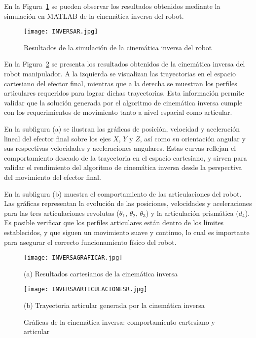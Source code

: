 En la Figura~\ref{fig:cinematica_inversa} se pueden observar los resultados obtenidos mediante la simulación en MATLAB de la cinemática inversa del robot.

\begin{figure}[H]
	\centering
	\texttt{[image: INVERSAR.jpg]}
	\caption{Resultados de la simulación de la cinemática inversa del robot}
	\label{fig:cinematica_inversa}
\end{figure}

En la Figura~\ref{fig:inversa_graficas} se presenta los resultados obtenidos de la cinemática inversa del robot manipulador. A la izquierda se visualizan las trayectorias en el espacio cartesiano del efector final, mientras que a la derecha se muestran los perfiles articulares requeridos para lograr dichas trayectorias. Esta información permite validar que la solución generada por el algoritmo de cinemática inversa cumple con los requerimientos de movimiento tanto a nivel espacial como articular.

En la subfigura (a) se ilustran las gráficas de posición, velocidad y aceleración lineal del efector final sobre los ejes $X$, $Y$ y $Z$, así como su orientación angular y sus respectivas velocidades y aceleraciones angulares. Estas curvas reflejan el comportamiento deseado de la trayectoria en el espacio cartesiano, y sirven para validar el rendimiento del algoritmo de cinemática inversa desde la perspectiva del movimiento del efector final.

En la subfigura (b) muestra el comportamiento de las articulaciones del robot. Las gráficas representan la evolución de las posiciones, velocidades y aceleraciones para las tres articulaciones revolutas ($\theta_1$, $\theta_2$, $\theta_3$) y la articulación prismática ($d_4$). Es posible verificar que los perfiles articulares están dentro de los límites establecidos, y que siguen un movimiento suave y continuo, lo cual es importante para asegurar el correcto funcionamiento físico del robot.

\begin{figure}[H]
	\centering
	\begin{minipage}[t]{0.49\textwidth}
		\centering
		\texttt{[image: INVERSAGRAFICAR.jpg]}
		\caption*{(a) Resultados cartesianos de la cinemática inversa}
	\end{minipage}
	\hfill
	\begin{minipage}[t]{0.49\textwidth}
		\centering
		\texttt{[image: INVERSAARTICULACIONESR.jpg]}
		\caption*{(b) Trayectoria articular generada por la cinemática inversa}
	\end{minipage}
	\caption{Gráficas de la cinemática inversa: comportamiento cartesiano y articular}
	\label{fig:inversa_graficas}
\end{figure}

